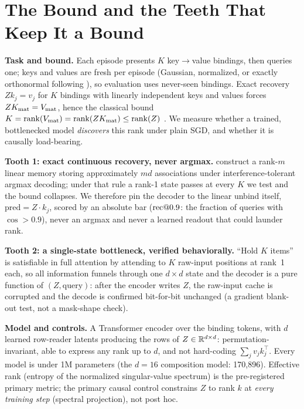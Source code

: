 \section{The Bound and the Teeth That Keep It a Bound}
\label{sec:setup}

\textbf{Task and bound.} Each episode presents $K$ key$\to$value
bindings, then queries one; keys and values are fresh per episode
(Gaussian, normalized, or exactly orthonormal following
\citealp{mezzadri2007random}), so evaluation uses never-seen bindings. Exact recovery $Z k_j = v_j$
for $K$ bindings with linearly independent keys and values forces
$Z K_{\mathrm{mat}} = V_{\mathrm{mat}}$, hence the classical bound
$K = \operatorname{rank}(V_{\mathrm{mat}}) = \operatorname{rank}(Z K_{\mathrm{mat}}) \leq \operatorname{rank}(Z)$
\citep{kohonen1972correlation,anderson1972simple}. We measure whether a
trained, bottlenecked model \emph{discovers} this rank under plain SGD,
and whether it is causally load-bearing.

\textbf{Tooth 1: exact continuous recovery, never argmax.}
\citet{nichani2025factual} construct a rank-$m$ linear memory storing
approximately $md$ associations under interference-tolerant argmax
decoding; under that rule a rank-1 state passes at every $K$ we test
and the bound collapses. We therefore pin the decoder to the linear
unbind itself, $\mathrm{pred} = Z \cdot k_j$, scored by an absolute bar
($\mathrm{rec}@0.9$: the fraction of queries with $\cos > 0.9$), never an
argmax and never a learned readout that could launder rank.

\textbf{Tooth 2: a single-state bottleneck, verified behaviorally.}
``Hold $K$ items'' is satisfiable in full attention by attending to
$K$ raw-input positions at rank~1 each, so all information
funnels through one $d \times d$ state and the decoder is a pure
function of $(Z, \mathrm{query})$: after the encoder writes $Z$, the
raw-input cache is corrupted and the decode is confirmed bit-for-bit
unchanged (a gradient blank-out test, not a mask-shape check).

\textbf{Model and controls.} A Transformer encoder over the binding
tokens, with $d$ learned row-reader latents producing the rows of
$Z \in \mathbb{R}^{d \times d}$: permutation-invariant, able to express any
rank up to $d$, and not hard-coding $\sum_j v_j k_j^\top$. Every model
is under 1M parameters (the $d = 16$ composition model: 170{,}896).
Effective rank (entropy of the normalized singular-value spectrum) is
the pre-registered primary metric; the primary causal control
constrains $Z$ to rank $k$ at \emph{every training step} (spectral
projection), not post hoc.
